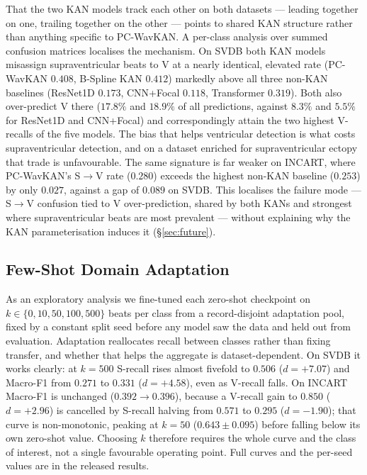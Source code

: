 \documentclass[journal,twoside,web]{ieeecolor}
\begin{document}
That the two KAN models track each other on both datasets --- leading together on one, trailing together on the other --- points to shared KAN structure rather than anything specific to PC-WavKAN. A per-class analysis over summed confusion matrices localises the mechanism. On SVDB both KAN models misassign supraventricular beats to V at a nearly identical, elevated rate (PC-WavKAN $0.408$, B-Spline KAN $0.412$) markedly above all three non-KAN baselines (ResNet1D $0.173$, CNN+Focal $0.118$, Transformer $0.319$). Both also over-predict V there ($17.8\%$ and $18.9\%$ of all predictions, against $8.3\%$ and $5.5\%$ for ResNet1D and CNN+Focal) and correspondingly attain the two highest V-recalls of the five models. The bias that helps ventricular detection is what costs supraventricular detection, and on a dataset enriched for supraventricular ectopy that trade is unfavourable. The same signature is far weaker on INCART, where PC-WavKAN's S$\rightarrow$V rate ($0.280$) exceeds the highest non-KAN baseline ($0.253$) by only $0.027$, against a gap of $0.089$ on SVDB. This localises the failure mode --- S$\rightarrow$V confusion tied to V over-prediction, shared by both KANs and strongest where supraventricular beats are most prevalent --- without explaining why the KAN parameterisation induces it (\S\ref{sec:future}).

\subsection{Few-Shot Domain Adaptation}
\label{sec:results_fewshot}
As an exploratory analysis we fine-tuned each zero-shot checkpoint on $k \in \{0,10,50,100,500\}$ beats per class from a record-disjoint adaptation pool, fixed by a constant split seed before any model saw the data and held out from evaluation. Adaptation reallocates recall between classes rather than fixing transfer, and whether that helps the aggregate is dataset-dependent. On SVDB it works clearly: at $k=500$ S-recall rises almost fivefold to $0.506$ ($d=+7.07$) and Macro-F1 from $0.271$ to $0.331$ ($d=+4.58$), even as V-recall falls. On INCART Macro-F1 is unchanged ($0.392\rightarrow0.396$), because a V-recall gain to $0.850$ ($d=+2.96$) is cancelled by S-recall halving from $0.571$ to $0.295$ ($d=-1.90$); that curve is non-monotonic, peaking at $k=50$ ($0.643\pm0.095$) before falling below its own zero-shot value. Choosing $k$ therefore requires the whole curve and the class of interest, not a single favourable operating point. Full curves and the per-seed values are in the released results.
\end{document}
